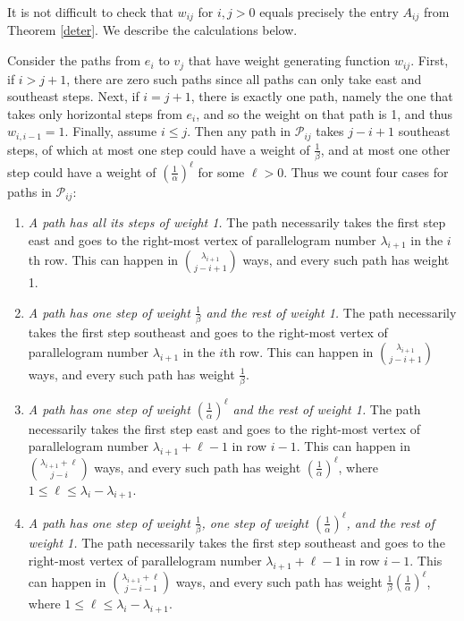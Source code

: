 \documentclass[11pt]{article}
\numberwithin{equation}{section}
\theoremstyle{plain}
\theoremstyle{definition}
\theoremstyle{remark}
\begin{document}
It is not difficult to check that $w_{ij}$ for $i,j>0$ equals precisely the entry $A_{ij}$ from Theorem \ref{deter}. We describe the calculations below.

Consider the paths from $e_i$ to $v_j$ that have weight generating function $w_{ij}$. First, if $i>j+1$, there are zero such paths since all paths can only take east and southeast steps. Next, if $i=j+1$, there is exactly one path, namely the one that takes only horizontal steps from $e_i$, and so the weight on that path is 1, and thus $w_{i,i-1}=1$. Finally, assume $i\leq j$. Then any path in $\mathcal{P}_{ij}$ takes $j-i+1$ southeast steps, of which at most one step could have a weight of $\frac{1}{\beta}$, and at most one other step could have a weight of $\left(\frac{1}{\alpha}\right)^{\ell}$ for some $\ell>0$. Thus we count four cases for paths in $\mathcal{P}_{ij}$: 
\begin{enumerate}
\item \emph{A path has all its steps of weight 1.} The path necessarily takes the first step east and goes to the right-most vertex of parallelogram number $\lambda_{i+1}$ in the $i$th row. This can happen in ${\lambda_{i+1} \choose j-i+1}$ ways, and every such path has weight 1.

\item \emph{A path has one step of weight $\frac{1}{\beta}$ and the rest of weight 1.} The path necessarily takes the first step southeast and goes to the right-most vertex of parallelogram number $\lambda_{i+1}$ in the $i$th row. This can happen in ${\lambda_{i+1} \choose j-i+1}$ ways, and every such path has weight $\frac{1}{\beta}$.

\item \emph{A path has one step of weight $\left(\frac{1}{\alpha}\right)^{\ell}$ and the rest of weight 1.} The path necessarily takes the first step east and goes to the right-most vertex of parallelogram number $\lambda_{i+1}+\ell-1$ in row $i-1$. This can happen in ${\lambda_{i+1}+\ell \choose j-i}$ ways, and every such path has weight $\left(\frac{1}{\alpha}\right)^{\ell}$, where $1\leq\ell\leq\lambda_i-\lambda_{i+1}$.

\item \emph{A path has one step of weight $\frac{1}{\beta}$, one step of weight $\left(\frac{1}{\alpha}\right)^{\ell}$, and the rest of weight 1.} The path necessarily takes the first step southeast and goes to the right-most vertex of parallelogram number $\lambda_{i+1}+\ell-1$ in row $i-1$. This can happen in ${\lambda_{i+1}+\ell \choose j-i-1}$ ways, and every such path has weight $\frac{1}{\beta}\left(\frac{1}{\alpha}\right)^{\ell}$, where $1\leq\ell\leq\lambda_i-\lambda_{i+1}$.
\end{enumerate}
\end{document}
